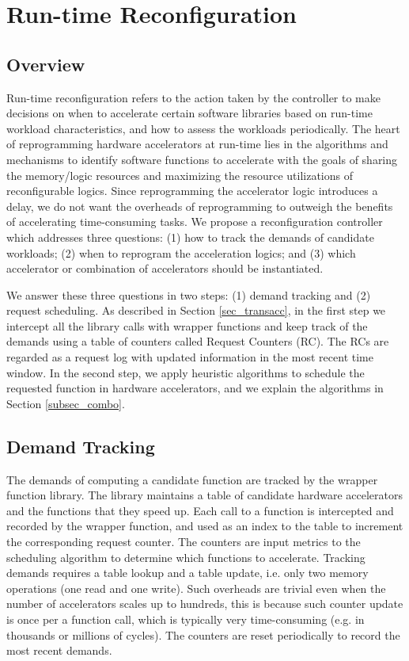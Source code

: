 \section{Run-time Reconfiguration }
\label{sec_runtime_reconfig}

\subsection{Overview}
\label{subsec_runtime_reconfig_overview}

Run-time reconfiguration refers to the action taken by the controller
to make decisions on when to accelerate certain software libraries
based on run-time workload characteristics, and how to assess the
workloads periodically. The heart of reprogramming hardware
accelerators at run-time lies in the algorithms and mechanisms to
identify software functions to accelerate with the goals of sharing
the memory/logic resources and maximizing the resource utilizations of
reconfigurable logics. Since reprogramming the accelerator logic 
introduces a delay, we do not want the overheads of
reprogramming to outweigh the benefits of accelerating time-consuming
tasks. We propose a reconfiguration controller which addresses three
questions: (1) how to track the demands of candidate workloads; (2)
when to reprogram the acceleration logics; and (3) which accelerator
or combination of accelerators should be instantiated.


We answer these three questions in two steps:
(1) demand tracking and (2) request scheduling. As described in
Section \ref{sec_transacc}, in the first step we intercept all the
library calls with wrapper functions and keep track of the demands
using a table of counters called Request Counters (RC). The RCs
are regarded as a request log with updated information in the most
recent time window. In the second step, we apply heuristic algorithms to
schedule the requested function in hardware accelerators, and we
explain the algorithms in Section \ref{subsec_combo}. 

\subsection{Demand Tracking} 

The demands of computing a candidate function are tracked by the
wrapper function library. The library maintains a table of candidate
hardware accelerators and the functions that they speed up. Each call
to a function is intercepted and recorded by the wrapper function, and used as an
index to the table to increment the corresponding request counter. The
counters are input metrics to the scheduling algorithm to determine which
functions to accelerate. Tracking demands requires a table
lookup and a table update, i.e. only two memory operations (one
read and one write). Such overheads are trivial even when the number
of accelerators scales up to hundreds, this is because such counter
update is once per a function call, which is typically very
time-consuming (e.g. in thousands or millions of cycles). The counters
are reset periodically to record the most recent demands. 


